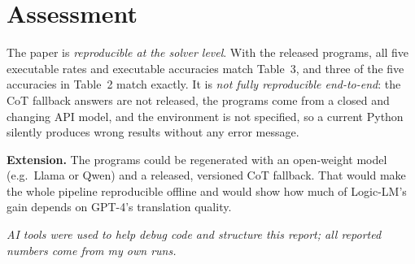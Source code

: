 \documentclass[conference]{IEEEtran}
\begin{document}
\section{Assessment}
The paper is \emph{reproducible at the solver level}. With the released
programs, all five executable rates and executable accuracies match Table~3,
and three of the five accuracies in Table~2 match exactly. It is \emph{not
fully reproducible end-to-end}: the CoT fallback answers are not released, the
programs come from a closed and changing API model, and the environment is not
specified, so a current Python silently produces wrong results without any
error message.

\textbf{Extension.} The programs could be regenerated with an open-weight model
(e.g.\ Llama or Qwen) and a released, versioned CoT fallback. That would make
the whole pipeline reproducible offline and would show how much of Logic-LM's
gain depends on GPT-4's translation quality.




\vspace{4pt}
\noindent\textit{AI tools were used to help debug code and structure this
report; all reported numbers come from my own runs.}
\end{document}
